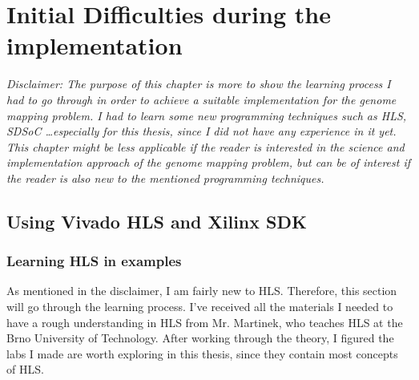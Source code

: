 
\chapter{Initial Difficulties during the implementation}

\textit{Disclaimer: The purpose of this chapter is more to show the learning process I had to go through in order to achieve a suitable implementation for the genome mapping problem. I had to learn some new programming techniques such as HLS, SDSoC \dots especially for this thesis, since I did not have any experience in it yet. This chapter might be less applicable if the reader is interested in the science and implementation approach of the genome mapping problem, but can be of interest if the reader is also new to the mentioned programming techniques.}

\section{Using Vivado HLS and Xilinx SDK}

\subsection{Learning HLS in examples}

As mentioned in the disclaimer, I am fairly new to HLS. Therefore, this section will go through the learning process. I've received all the materials I needed to have a rough understanding in HLS from Mr. Martinek, who teaches HLS at the Brno University of Technology. After working through the theory, I figured the labs I made are worth exploring in this thesis, since they contain most concepts of HLS.

